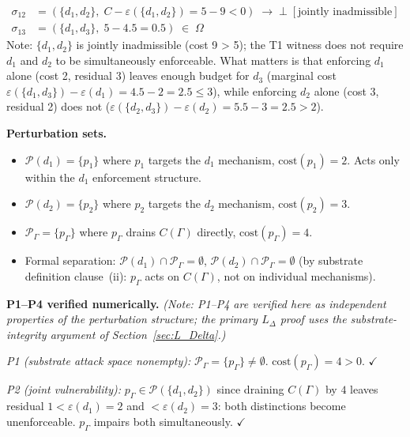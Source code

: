\documentclass[11pt]{article}
\theoremstyle{remark}
\begin{document}
\begin{itemize}[nosep,leftmargin=2em,itemsep=2pt]
\begin{align*}
      \sigma_{12} &= (\{d_1,d_2\},\; C - \varepsilon(\{d_1,d_2\}) = 5 - 9 < 0) \;\to\; \bot \;[\text{jointly inadmissible}]\\
      \sigma_{13} &= (\{d_1,d_3\},\; 5 - 4.5 = 0.5) \;\in\; \Omega
    \end{align*}
    Note: $\{d_1,d_2\}$ is jointly inadmissible (cost 9 > 5); the T1 witness does not require $d_1$ and $d_2$ to be simultaneously enforceable.  What matters is that enforcing $d_1$ alone (cost 2, residual 3) leaves enough budget for $d_3$ (marginal cost $\varepsilon(\{d_1,d_3\}) - \varepsilon(d_1) = 4.5 - 2 = 2.5 \le 3$), while enforcing $d_2$ alone (cost 3, residual 2) does not ($\varepsilon(\{d_2,d_3\}) - \varepsilon(d_2) = 5.5 - 3 = 2.5 > 2$).
\end{itemize}

\textbf{Perturbation sets.}
\begin{itemize}[nosep,leftmargin=2em,itemsep=2pt]
  \item $\mathcal{P}(d_1) = \{p_1\}$ where $p_1$ targets the $d_1$ mechanism,
    $\mathrm{cost}(p_1) = 2$.  Acts only within the $d_1$ enforcement structure.
  \item $\mathcal{P}(d_2) = \{p_2\}$ where $p_2$ targets the $d_2$ mechanism,
    $\mathrm{cost}(p_2) = 3$.
  \item $\mathcal{P}_\Gamma = \{p_\Gamma\}$ where $p_\Gamma$ drains $C(\Gamma)$
    directly, $\mathrm{cost}(p_\Gamma) = 4$.
  \item Formal separation: $\mathcal{P}(d_1) \cap \mathcal{P}_\Gamma = \emptyset$,
    $\mathcal{P}(d_2) \cap \mathcal{P}_\Gamma = \emptyset$ (by substrate definition
    clause~(ii): $p_\Gamma$ acts on $C(\Gamma)$, not on individual mechanisms).
\end{itemize}

\textbf{P1--P4 verified numerically.}  \textit{(Note: P1--P4 are verified here as independent properties of the perturbation structure; the primary $L_\Delta$ proof uses the substrate-integrity argument of Section~\ref{sec:L_Delta}.)}

\textit{P1 (substrate attack space nonempty):}  $\mathcal{P}_\Gamma = \{p_\Gamma\}
\ne \emptyset$.  $\mathrm{cost}(p_\Gamma) = 4 > 0$.  $\checkmark$

\textit{P2 (joint vulnerability):}  $p_\Gamma \in \mathcal{P}(\{d_1,d_2\})$
since draining $C(\Gamma)$ by $4$ leaves residual $1 < \varepsilon(d_1) = 2$
and $< \varepsilon(d_2) = 3$: both distinctions become unenforceable.
$p_\Gamma$ impairs both simultaneously.  $\checkmark$
\end{document}
